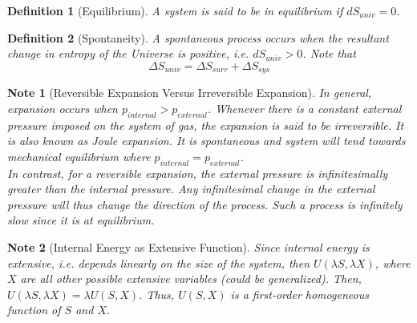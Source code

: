 \documentclass[a4paper]{article}
\newtheorem{defi}{Definition}[section]
\theoremstyle{new}
\newtheorem{Note}{Note}[section]
\begin{document}
\begin{defi}[Equilibrium]
A system is said to be in equilibrium if $dS_{univ}=0$.
\end{defi}
\begin{defi}[Spontaneity]
A spontaneous process occurs when the resultant change in entropy of the Universe is positive, i.e. $dS_{univ}>0$. Note that
$$\Delta S_{univ}=\Delta S_{surr}+\Delta S_{sys}$$
\end{defi}
\begin{Note}[Reversible Expansion Versus Irreversible Expansion]
In general, expansion occurs when $p_{internal}>p_{external}$. Whenever there is a constant external pressure imposed on the system of gas, the expansion is said to be irreversible. It is also known as Joule expansion. It is spontaneous and system will tend towards mechanical equilibrium where $p_{internal}=p_{external}$.\\[5pt]
In contrast, for a reversible expansion, the external pressure is infinitesimally greater than the internal pressure. Any infinitesimal change in the external pressure will thus change the direction of the process. Such a process is infinitely slow since it is at equilibrium.
\end{Note}
\begin{Note}[Internal Energy as Extensive Function]
Since internal energy is extensive, i.e. depends linearly on the size of the system, then $U(\lambda S, \lambda X)$, where $X$ are all other possible extensive variables (could be generalized). Then, $U(\lambda S,\lambda X)=\lambda U(S,X)$. Thus, $U(S,X)$ is a first-order homogeneous function of $S$ and $X$.
\end{Note}
\newpage
\end{document}
